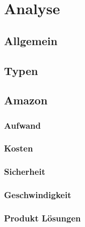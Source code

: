 

\chapter{Analyse}

\section{Allgemein}

\section{Typen}

\section{Amazon}
\subsection{Aufwand}

\subsection{Kosten}

\subsection{Sicherheit}

\subsection{Geschwindigkeit}

\subsection{Produkt Lösungen}



